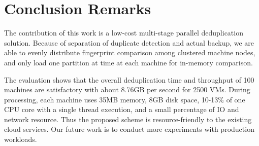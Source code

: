 \section{Conclusion Remarks}
\label{sect:final}

The contribution  of this work is a low-cost multi-stage parallel deduplication solution.
Because of separation  of duplicate detection and actual backup,
we are able to evenly distribute  fingerprint comparison among clustered machine
nodes, and only load one partition at time at each machine for in-memory comparison.

The evaluation shows that the overall 
deduplication time and throughput of 100 machines  are satisfactory with 
about 8.76GB per second for 2500 VMs. During processing, each machine uses 
35MB memory, 8GB disk space, 10-13\% of one CPU core with a single thread  execution,
and a small percentage of IO and network resource.
Thus the proposed  scheme is resource-friendly to the existing cloud services.
Our future work is to conduct more experiments with production workloads.



